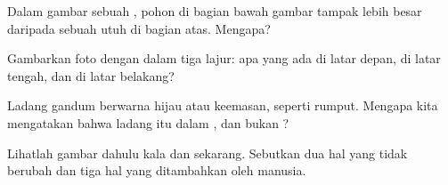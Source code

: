 \begin{exercise}[$\star\star$]\label{exo:g1:landscapes-around-us:8}
Dalam gambar sebuah , pohon di bagian bawah gambar tampak lebih
besar daripada sebuah  utuh di bagian atas. Mengapa?
\end{exercise}

\begin{exercise}[$\star\star$]\label{exo:g1:landscapes-around-us:9}
Gambarkan foto  dengan  dalam tiga lajur: apa yang ada di
latar depan, di latar tengah, dan di latar belakang?
\end{exercise}

\begin{exercise}[$\star\star$]\label{exo:g1:landscapes-around-us:10}
Ladang gandum berwarna hijau atau keemasan, seperti rumput. Mengapa kita
mengatakan bahwa ladang itu  dalam , dan bukan
?
\end{exercise}

\begin{exercise}[$\star\star$]\label{exo:g1:landscapes-around-us:11}
Lihatlah gambar  dahulu kala dan sekarang. Sebutkan dua hal yang
tidak berubah dan tiga hal yang ditambahkan oleh manusia.
\end{exercise}
